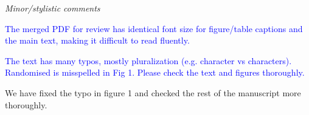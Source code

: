 \documentclass[12pt,letterpaper]{article}
\renewcommand{\subsection}[1]{%
\bigskip
\begin{center}
\begin{large}
\normalfont\itshape #1
\end{large}
\end{center}}
\begin{document}
\subsection{Minor/stylistic comments}

\textcolor{blue}{The merged PDF for review has identical font size for figure/table captions and the main text, making it difficult to read fluently.}


\textcolor{blue}{The text has many typos, mostly pluralization (e.g. character vs characters). Randomised is misspelled in Fig 1. Please check the text and figures thoroughly.}

We have fixed the typo in figure 1 and checked the rest of the manuscript more thoroughly.



\end{document}
